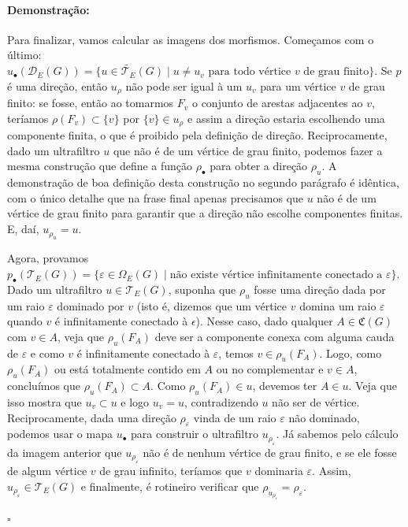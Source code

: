 \documentclass[11pt]{article}
\newcommand{\pulinho}{\vspace{.5cm}}
\theoremstyle{definition}
\theoremstyle{definition}
\theoremstyle{definition}
\theoremstyle{definition}
\theoremstyle{definition}
\theoremstyle{definition}
\theoremstyle{definition}
\theoremstyle{definition}
\theoremstyle{definition}
\theoremstyle{definition}
\theoremstyle{definition}
\theoremstyle{definition}
\newenvironment{prova}{\paragraph{Demonstração:}}{\hfill$\square$ 
\pulinho
}
\begin{document}
\begin{prova}
Para finalizar, vamos calcular as imagens dos morfismos. Começamos com o último: $u_\bullet(\mathcal{D}_E(G)) = \{u \in \widetilde{\mathcal{T}_E}(G) \mid u \neq u_v \text{ para todo vértice } v  \text{ de grau finito}\}$. Se $p$ é uma direção, então $u_\rho$ não pode ser igual à um $u_v$ para um vértice $v$ de grau finito: se fosse, então ao tomarmos $F_v$ o conjunto de arestas adjacentes ao $v$, teríamos $\rho(F_v) \subset \{v\}$ por $\{v\} \in u_\rho$ e assim a direção estaria escolhendo uma componente finita, o que é proibido pela definição de direção. Reciprocamente, dado um ultrafiltro $u$ que não é de um vértice de grau finito, podemos fazer a mesma construção que define a função $\rho_\bullet$ para obter a direção $\rho_u$. A demonstração de boa definição desta construção no segundo parágrafo é idêntica, com o único detalhe que na frase final apenas precisamos que $u$ não é de um vértice de grau finito para garantir que a direção não escolhe componentes finitas. E, daí, $u_{\rho_u} = u$.

Agora, provamos $p_\bullet(\mathcal{T}_E(G)) = \{\varepsilon \in \Omega_E(G) \mid \text{não existe vértice infinitamente conectado a } \varepsilon\}$. Dado um ultrafiltro $u \in \mathcal{T}_E(G)$, suponha que $\rho_u$ fosse uma direção dada por um raio $\varepsilon$ dominado por $v$ (isto é, dizemos que um vértice $v$ domina um raio $\varepsilon$ quando $v$ é infinitamente conectado à $\epsilon$). Nesse caso, dado qualquer $A \in \mathfrak{C}(G)$ com $v \in A$, veja que $\rho_u(F_A)$ deve ser a componente conexa com alguma cauda de $\varepsilon$ e como $v$ é infinitamente conectado à $\varepsilon$, temos $v \in \rho_u(F_A)$. Logo, como $\rho_u(F_A)$ ou está totalmente contido em $A$ ou no complementar e $v \in A$, concluímos que $\rho_u(F_A) \subset A$. Como $\rho_u(F_A) \in u$, devemos ter $A \in u$. Veja que isso mostra que $u_v \subset u$ e logo $u_v = u$, contradizendo $u$ não ser de vértice. Reciprocamente, dada uma direção $\rho_\varepsilon$ vinda de um raio $\varepsilon$ não dominado, podemos usar o mapa $u_\bullet$ para construir o ultrafiltro $u_{\rho_\varepsilon}$. Já sabemos pelo cálculo da imagem anterior que $u_{\rho_\varepsilon}$ não é de nenhum vértice de grau finito, e se ele fosse de algum vértice $v$ de grau infinito, teríamos que $v$ dominaria $\varepsilon$. Assim, $u_{\rho_\varepsilon} \in \mathcal{T}_E(G)$ e finalmente, é rotineiro verificar que $\rho_{ u_{\rho_\varepsilon}} = \rho_\varepsilon$.

\end{prova}
\end{document}
